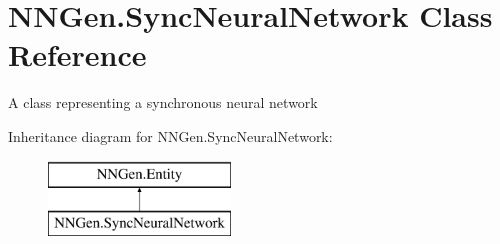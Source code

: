 \hypertarget{class_n_n_gen_1_1_sync_neural_network}{}\section{N\+N\+Gen.\+Sync\+Neural\+Network Class Reference}
\label{class_n_n_gen_1_1_sync_neural_network}


A class representing a synchronous neural network  


Inheritance diagram for N\+N\+Gen.\+Sync\+Neural\+Network\+:\begin{figure}[H]
\begin{center}
\leavevmode
\includegraphics[height=2.000000cm]{class_n_n_gen_1_1_sync_neural_network}
\end{center}
\end{figure}
